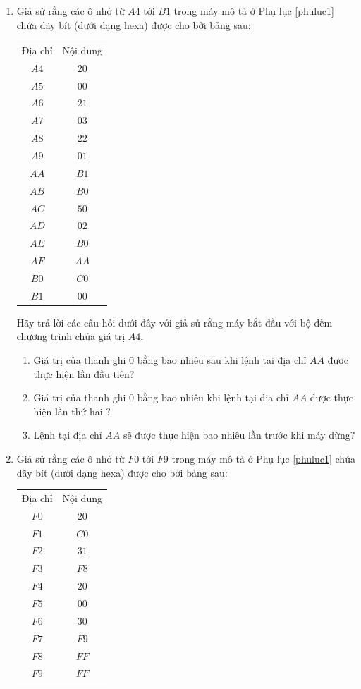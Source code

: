 \begin{enumerate}
\item \label{ex:233} Giả sử rằng các ô nhớ từ $A4$ tới $B1$ trong máy mô tả ở Phụ lục
  \ref{phuluc1} chứa dãy bít (dưới dạng hexa) được cho bởi bảng sau:
 
\begin{tabular}{cc}
  Địa chỉ & Nội dung \\
  $A4$    & $20$     \\
  $A5$    & $00$     \\
  $A6$    & $21$     \\
  $A7$    & $03$     \\
  $A8$    & $22$     \\
  $A9$     & $01$ \\
  $AA$    & $B1$     \\
  $AB$    & $B0$     \\
  $AC$     & $50$ \\
  $AD$    & $02$     \\
  $AE$     & $B0$ \\
  $AF$    & $AA$     \\
  $B0$    & $C0$     \\
  $B1$     & $00$ 
\end{tabular}

Hãy trả lời các câu hỏi dưới đây với giả sử rằng máy bắt đầu với bộ đếm chương trình chứa
giá trị $A4$.

\begin{enumerate}
\item Giá trị của thanh ghi $0$ bằng bao nhiêu sau khi lệnh tại địa chỉ $AA$ được thực
  hiện lần đầu tiên?

\item Giá trị của thanh ghi $0$ bằng bao nhiêu khi lệnh tại địa chỉ $AA$ được thực hiện
  lần thứ hai ?

\item Lệnh tại địa chỉ $AA$ sẽ được thực hiện bao nhiêu lần trước khi máy dừng?
\end{enumerate}

\item \label{ex:234} Giả sử rằng các ô nhớ từ $F0$ tới $F9$ trong máy mô tả ở Phụ lục
  \ref{phuluc1} chứa dãy bít (dưới dạng hexa) được cho bởi bảng sau:
 
  \begin{tabular}{cc}
    Địa chỉ & Nội dung \\
    $F0$    & $20$     \\ 
    $F1$    & $C0$     \\
    $F2$    & $31$     \\
    $F3$    & $F8$     \\
    $F4$    & $20$     \\
    $F5$     & $00$ \\
    $F6$    & $30$     \\
    $F7$    & $F9$     \\
    $F8$     & $FF$ \\
    $F9$    & $FF$     \\
  \end{tabular}


\end{enumerate}
